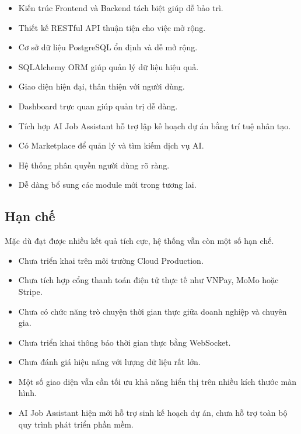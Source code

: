 \begin{itemize}

\item Kiến trúc Frontend và Backend tách biệt giúp dễ bảo trì.

\item Thiết kế RESTful API thuận tiện cho việc mở rộng.

\item Cơ sở dữ liệu PostgreSQL ổn định và dễ mở rộng.

\item SQLAlchemy ORM giúp quản lý dữ liệu hiệu quả.

\item Giao diện hiện đại, thân thiện với người dùng.

\item Dashboard trực quan giúp quản trị dễ dàng.

\item Tích hợp AI Job Assistant hỗ trợ lập kế hoạch dự án bằng trí tuệ nhân tạo.

\item Có Marketplace để quản lý và tìm kiếm dịch vụ AI.

\item Hệ thống phân quyền người dùng rõ ràng.

\item Dễ dàng bổ sung các module mới trong tương lai.

\end{itemize}


\subsection{Hạn chế}

Mặc dù đạt được nhiều kết quả tích cực, hệ thống vẫn còn một số hạn chế.

\begin{itemize}

\item Chưa triển khai trên môi trường Cloud Production.

\item Chưa tích hợp cổng thanh toán điện tử thực tế như VNPay, MoMo hoặc Stripe.

\item Chưa có chức năng trò chuyện thời gian thực giữa doanh nghiệp và chuyên gia.

\item Chưa triển khai thông báo thời gian thực bằng WebSocket.

\item Chưa đánh giá hiệu năng với lượng dữ liệu rất lớn.

\item Một số giao diện vẫn cần tối ưu khả năng hiển thị trên nhiều kích thước màn hình.

\item AI Job Assistant hiện mới hỗ trợ sinh kế hoạch dự án, chưa hỗ trợ toàn bộ quy trình phát triển phần mềm.

\end{itemize}

